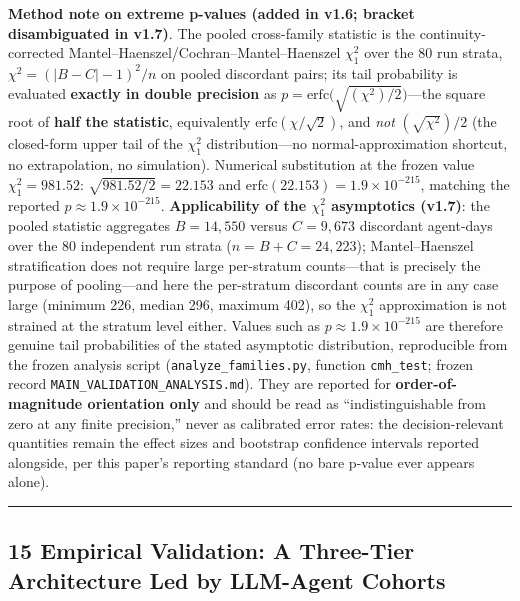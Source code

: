 \documentclass[
  11pt]{article}
\begin{document}
\textbf{Method note on extreme p-values (added in v1.6; bracket
disambiguated in v1.7)}. The pooled cross-family statistic is the
continuity-corrected Mantel--Haenszel/Cochran--Mantel--Haenszel
\(\chi^2_1\) over the 80 run strata, \(\chi^2 = (|B - C| - 1)^2 / n\) on
pooled discordant pairs; its tail probability is evaluated
\textbf{exactly in double precision} as
\(p = \mathrm{erfc}\big(\sqrt{(\chi^2)/2}\big)\)---the square root of
\textbf{half the statistic}, equivalently
\(\mathrm{erfc}(\chi/\sqrt{2})\), and \emph{not} \((\sqrt{\chi^2})/2\)
(the closed-form upper tail of the \(\chi^2_1\) distribution---no
normal-approximation shortcut, no extrapolation, no simulation).
Numerical substitution at the frozen value \(\chi^2_1 = 981.52\):
\(\sqrt{981.52/2} = 22.153\) and
\(\mathrm{erfc}(22.153) = 1.9\times10^{-215}\), matching the reported
\(p \approx 1.9\times10^{-215}\). \textbf{Applicability of the
\(\chi^2_1\) asymptotics (v1.7)}: the pooled statistic aggregates
\(B = 14{,}550\) versus \(C = 9{,}673\) discordant agent-days over the
80 independent run strata (\(n = B + C = 24{,}223\)); Mantel--Haenszel
stratification does not require large per-stratum counts---that is
precisely the purpose of pooling---and here the per-stratum discordant
counts are in any case large (minimum 226, median 296, maximum 402), so
the \(\chi^2_1\) approximation is not strained at the stratum level
either. Values such as \(p \approx 1.9\times10^{-215}\) are therefore
genuine tail probabilities of the stated asymptotic distribution,
reproducible from the frozen analysis script
(\texttt{analyze\_families.py}, function \texttt{cmh\_test}; frozen
record \texttt{MAIN\_VALIDATION\_ANALYSIS.md}). They are reported for
\textbf{order-of-magnitude orientation only} and should be read as
``indistinguishable from zero at any finite precision,'' never as
calibrated error rates: the decision-relevant quantities remain the
effect sizes and bootstrap confidence intervals reported alongside, per
this paper's reporting standard (no bare p-value ever appears alone).

\begin{center}\rule{0.5\linewidth}{0.5pt}\end{center}

\subsection{15 Empirical Validation: A Three-Tier Architecture Led by
LLM-Agent
Cohorts}\label{empirical-validation-a-three-tier-architecture-led-by-llm-agent-cohorts}
\end{document}
